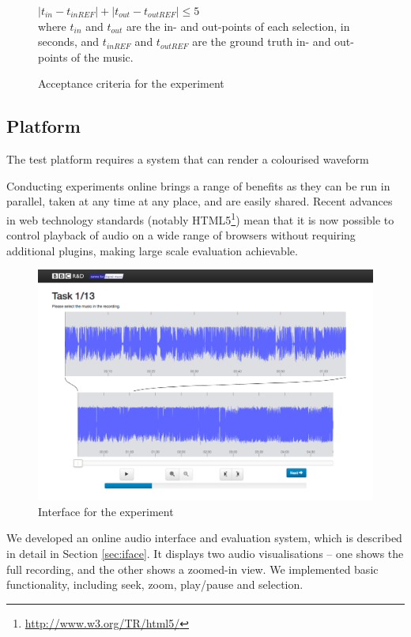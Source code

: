 \begin{figure}[ht]
  \begin{center}
    $ |t_{in}-t_{inREF}| + |t_{out}-t_{outREF}| \leq 5 $\\[1em]
    where $t_{in}$ and $t_{out}$ are the in- and out-points of each selection, in seconds,
    and $t_{inREF}$ and $t_{outREF}$ are the ground truth in- and out-points of the music.
  \end{center}
  \caption{Acceptance criteria for the experiment}
  \label{eq:accept}
\end{figure}

\subsection{Platform}
The test platform requires a system that can render a colourised waveform

Conducting experiments online brings a range of benefits as they can be run in parallel, taken at any time at any
place, and are easily shared. Recent advances in web technology standards (notably
HTML5\footnote{\url{http://www.w3.org/TR/html5/}}) mean that it is now possible to control playback of audio on a wide
range of browsers without requiring additional plugins, making large scale evaluation achievable.

\begin{figure}[ht]
  \centering
  \includegraphics[width=\textwidth]{figs/waveform-interface.png}
  \caption{Interface for the experiment}
  \label{fig:colourised-interface}
\end{figure}

We developed an online audio interface and evaluation system, which is described in detail in Section \ref{sec:iface}.
It displays two audio visualisations -- one shows the full recording, and the other shows a zoomed-in view. We
implemented basic functionality, including seek, zoom, play/pause and selection.

